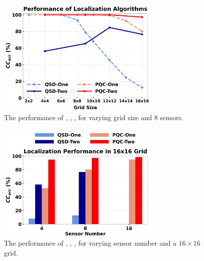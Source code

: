 
\begin{figure}[t]
    \centering
    \includegraphics[width=0.7\textwidth]{chapters/qce/figures/discrete.varygrid.png}
    \caption{The performance of \povmone, \povm, \pqcone, \pqctwo for varying grid size and 8 sensors.}
    \label{fig:discrete.varygrid}
\end{figure}


\begin{figure}[t]
    \centering
    \includegraphics[width=0.7\textwidth]{chapters/qce/figures/discrete.varysensornum.png}
    \caption{The performance of \povmone, \povm, \pqcone, \pqctwo for varying sensor number and a $16\times16$ grid.}
    \label{fig:discrete.varysen}
\end{figure}

